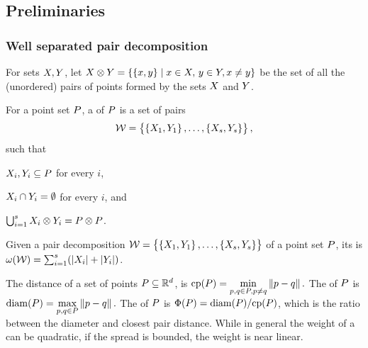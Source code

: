 \documentclass[12pt]{article}%
\begin{document}
\subsection{Preliminaries}

\subsubsection{Well separated pair decomposition}

For sets $X, Y$, let
\begin{math}
    \PSX \otimes \PSY%
    =%
    \Set{\brc{\px,\py}}{ \px\in \PSX,\, \py\in \PSY, \px \ne \py }
\end{math}
be the set of all the (unordered) pairs of points formed by the sets
$X$ and $Y$.

\begin{defn}
    For a point set $P$, a  of $P$ is a set of pairs
    \begin{equation*}
        \mathcal{W} = \left\{ {\bigl. \left\{ {X_1,Y_1} \right\},\ldots,\left\{ {X_s,Y_s} \right\}} \right\},
    \end{equation*}
    such that
    \begin{enumerate*}[label=(\Roman*)]
        \item $X_i,Y_i\subseteq P$ for every $i$,
        \item $X_i \cap Y_i = \emptyset$ for every $i$, and
        \item
        $\bigcup_{i=1}^s X_i \otimes Y_i = P \otimes P$.
    \end{enumerate*}
\end{defn}

\begin{defn}
    Given a pair decomposition
    $\mathcal{W} = \left\{ {\bigl. \left\{ {X_1,Y_1} \right\},\ldots,\left\{ {X_s,
          Y_s} \right\}} \right\}$ of a point set $P$, its  is
    $\WeightX{\WS} = \sum_{i=1}^s \pth{ \cardin{\PSX_i } +
       \cardin{\PSY_i}}$.
\end{defn}

The  distance of a set of points
$P \subseteq \mathbb{R}^d$, is
\begin{math}
    \cpX{\PS} = \underset{\pa, \pb \in \PS, \pa \neq \pb}{\min}
    \dY{\pa}{\pb}.
\end{math}
The  of $P$ is
\begin{math}
    \diamX{\PS} = \underset{\pa, \pb \in \PS}{\max}\dY{\pa}{\pb}.
\end{math}
The  of $P$ is
$\spreadX{\PS} = \diamX{\PS} / \cpX{\PS}$, which is the ratio between
the diameter and closest pair distance.  While in general the weight
of a \WSPD can be quadratic, if the spread is bounded, the weight is
near linear.
\end{document}
